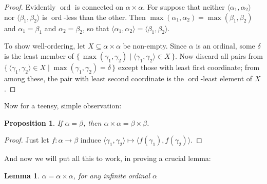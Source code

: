 \documentclass[10pt,a4paper]{article}
\theoremstyle{plain}
\newtheorem{lem}[thm]{Lemma}
\newtheorem{prop}[thm]{Proposition}
\theoremstyle{definition}
\theoremstyle{remark}
\newcommand*{\ollabel}[1]{\label{#1}}
\providecommand{\tuple}[1]{\langle #1 \rangle}
\providecommand{\canonord}{\operatorname{ord}}
\providecommand{\Setabs}[2]{\{\, #1 \mid #2 \,\}}
\providecommand{\cardeq}[2]{#1 = #2}
\begin{document}
\begin{proof}
Evidently $\canonord$ is connected on $\alpha \times \alpha$. For
suppose that neither $\tuple{\alpha_1, \alpha_2}$ nor $\tuple{\beta_1,
\beta_2}$ is $\canonord$-less than the other. Then $\max(\alpha_1,
\alpha_2) = \max(\beta_1, \beta_2)$ and $\alpha_1 = \beta_1$ and
$\alpha_2 = \beta_2$, so that $\tuple{\alpha_1, \alpha_2} =
\tuple{\beta_1,  \beta_2}$.

To show well-ordering, let $X \subseteq \alpha\times\alpha$ be
non-empty. Since $\alpha$ is an ordinal, some $\delta$ is the least
member of $\Setabs{\max(\gamma_1, \gamma_2)}{\tuple{\gamma_1,
\gamma_2} \in X}$. Now discard all pairs from
$\Setabs{\tuple{\gamma_1,\gamma_2} \in X}{\max(\gamma_1, \gamma_2) =
\delta}$ except those with least first coordinate; from among these,
the pair with least second coordinate is the $\canonord$-least element
of $X$.
\end{proof}
\noindent
Now for a teensy, simple observation:

\begin{prop}\ollabel{simplecardproduct}
If $\cardeq{\alpha}{\beta}$, then $\cardeq{\alpha \times \alpha}{\beta
\times \beta}$. 
\end{prop}

\begin{proof}
Just let $f \colon \alpha \to \beta$ induce $\tuple{\gamma_1,
\gamma_2} \mapsto \tuple{f(\gamma_1), f(\gamma_2)}$.
\end{proof}
\noindent
And now we will put all this to work, in proving a crucial lemma:
\begin{lem}\ollabel{alphatimesalpha}
$\cardeq{\alpha}{\alpha \times \alpha}$, for any infinite ordinal
$\alpha$
\end{lem}
\end{document}
